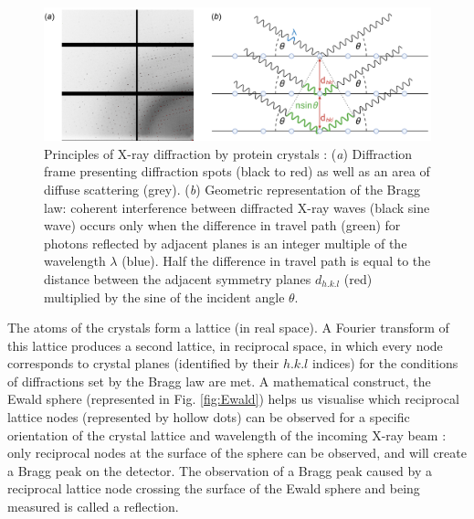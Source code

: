 \begin{figure}[H] %
    \centering
    \noindent \includegraphics[width=\textwidth]{images/Introduction/Figure_analysis_1.pdf}
    \hfill
    \caption{Principles of X-ray diffraction by protein crystals : (\textit{a}) Diffraction frame  presenting diffraction spots (black to red) as well as an area of diffuse scattering (grey). (\textit{b}) Geometric representation of the Bragg law: coherent interference between diffracted X-ray waves (black sine wave) occurs only when the difference in travel path (green) for photons reflected by adjacent planes is an integer multiple of the wavelength \(\lambda\) (blue). Half the difference in travel path is equal to the distance between the adjacent symmetry planes \(d_{h.k.l}\) (red) multiplied by the sine of the incident angle \(\theta\).} \label{fig:DiffractionPrinciples_1}
\end{figure}
The atoms of the crystals form a lattice (in real space). A Fourier transform of this lattice produces a second lattice, in reciprocal space, in which every node corresponds to crystal planes (identified by their \(h.k.l\) indices) for the conditions of diffractions set by the Bragg law are met. A mathematical construct, the Ewald sphere (represented in Fig. \ref{fig:Ewald}) helps us visualise which reciprocal lattice nodes (represented by hollow dots) can be observed for a specific orientation of the crystal lattice and wavelength of the incoming X-ray beam \parencite{drenthPrinciplesProteinXray1999}: only reciprocal nodes at the surface of the sphere can be observed, and will create a Bragg peak on the detector. The observation of a Bragg peak caused by a reciprocal lattice node crossing the surface of the Ewald sphere and being measured is called a reflection. 


